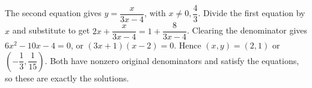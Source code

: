 The second equation gives $y=\dfrac{x}{3x-4}$, with $x\ne0,\dfrac{4}{3}$. Divide the first equation by $x$ and substitute to get $2x+\dfrac{x}{3x-4}=1+\dfrac{8}{3x-4}$. Clearing the denominator gives $6x^2-10x-4=0$, or $(3x+1)(x-2)=0$. Hence $(x,y)=(2,1)$ or $(-\dfrac{1}{3},\dfrac{1}{15})$. Both have nonzero original denominators and satisfy the equations, so these are exactly the solutions.
